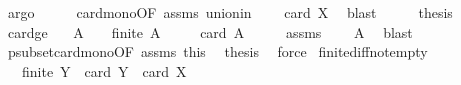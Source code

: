 \begin{isabellebody}
\ argo\isanewline
\ \ \isamarkupfalse%
\ \isamarkupfalse%
\ card{\isacharunderscore}{\kern0pt}mono{\isacharbrackleft}{\kern0pt}OF\ assms{\isacharparenleft}{\kern0pt}{}{\isacharparenright}{\kern0pt}\ union{\isacharunderscore}{\kern0pt}in{\isacharbrackright}{\kern0pt}\ \isamarkupfalse%
\ {\isachardoublequoteopen}{\isachardot}{\kern0pt}{\isachardot}{\kern0pt}{\isachardot}{\kern0pt}\ {\isasymle}\ card\ X{\isachardoublequoteclose}\ \isamarkupfalse%
\ blast\isanewline
\ \ \isamarkupfalse%
\ \isamarkupfalse%
\ {\isacharquery}{\kern0pt}thesis\ \isacommand{{\isachardot}{\kern0pt}}\isamarkupfalse%
\isanewline
{}\isamarkupfalse%
%
\endisatagproof
{\isafoldproof}%
%
\isadelimproof
\isanewline
%
\endisadelimproof
\isanewline
{}\isamarkupfalse%
\ card{\isacharunderscore}{\kern0pt}ge{\isacharunderscore}{\kern0pt}{}{\isacharcolon}{\kern0pt}\isanewline
\ \ \ {\isachardoublequoteopen}A\ {\isasymnoteq}\ {\isacharbraceleft}{\kern0pt}{\isacharbraceright}{\kern0pt}{\isachardoublequoteclose}\ \ {\isachardoublequoteopen}finite\ A{\isachardoublequoteclose}\isanewline
\ \ \ {\isachardoublequoteopen}{}\ {\isacharless}{\kern0pt}\ card\ A{\isachardoublequoteclose}\isanewline
%
\isadelimproof
%
\endisadelimproof
%
\isatagproof
{}\isamarkupfalse%
\ {\isacharminus}{\kern0pt}\isanewline
\ \ \isamarkupfalse%
\ assms{\isacharparenleft}{\kern0pt}{}{\isacharparenright}{\kern0pt}\ \isamarkupfalse%
\ {\isachardoublequoteopen}{\isacharbraceleft}{\kern0pt}{\isacharbraceright}{\kern0pt}\ {\isasymsubset}\ A{\isachardoublequoteclose}\ \isamarkupfalse%
\ blast\isanewline
\ \ \isamarkupfalse%
\ psubset{\isacharunderscore}{\kern0pt}card{\isacharunderscore}{\kern0pt}mono{\isacharbrackleft}{\kern0pt}OF\ assms{\isacharparenleft}{\kern0pt}{}{\isacharparenright}{\kern0pt}\ this{\isacharbrackright}{\kern0pt}\ \isamarkupfalse%
\ {\isacharquery}{\kern0pt}thesis\ \isamarkupfalse%
\ force\isanewline
{}\isamarkupfalse%
%
\endisatagproof
{\isafoldproof}%
%
\isadelimproof
\isanewline
%
\endisadelimproof
\isanewline
{}\isamarkupfalse%
\ finite{\isacharunderscore}{\kern0pt}diff{\isacharunderscore}{\kern0pt}not{\isacharunderscore}{\kern0pt}empty{\isacharcolon}{\kern0pt}\ \isanewline
\ \ \ {\isachardoublequoteopen}finite\ Y{\isachardoublequoteclose}\ \ {\isachardoublequoteopen}card\ Y\ {\isacharless}{\kern0pt}\ card\ X{\isachardoublequoteclose}\isanewline

\end{isabellebody}

